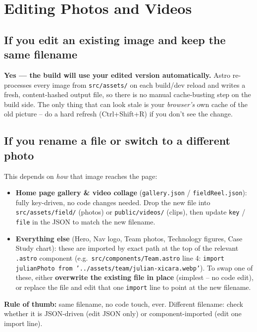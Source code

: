 \documentclass[11pt]{article}
\newcommand{\code}[1]{\texttt{\small #1}}
\newcommand{\file}[1]{\texttt{\small\color{ixaccent}#1}}
\begin{document}
\section{Editing Photos and Videos}

\subsection{If you edit an existing image and keep the same filename}
\textbf{Yes --- the build will use your edited version automatically.} Astro
re-processes every image from \file{src/assets/} on each build/dev reload
and writes a fresh, content-hashed output file, so there is no manual
cache-busting step on the build side. The only thing that can look stale is
your \emph{browser's} own cache of the old picture -- do a hard refresh
(Ctrl+Shift+R) if you don't see the change.

\subsection{If you rename a file or switch to a different photo}
This depends on \emph{how} that image reaches the page:

\begin{itemize}[leftmargin=1.4em]
  \item \textbf{Home page gallery \& video collage} (\file{gallery.json} /
    \file{fieldReel.json}): fully key-driven, no code changes needed. Drop
    the new file into \file{src/assets/field/} (photos) or
    \file{public/videos/} (clips), then update \code{key} / \code{file} in
    the JSON to match the new filename.
  \item \textbf{Everything else} (Hero, Nav logo, Team photos, Technology
    figures, Case Study chart): these are imported by exact path at the top
    of the relevant \file{.astro} component (e.g.\
    \file{src/components/Team.astro} line 4:
    \code{import julianPhoto from '../assets/team/julian-xicara.webp'}). To
    swap one of these, either \textbf{overwrite the existing file in place}
    (simplest -- no code edit), or replace the file and edit that one
    \code{import} line to point at the new filename.
\end{itemize}

\begin{notebox}
\textbf{Rule of thumb:} same filename, no code touch, ever. Different
filename: check whether it is JSON-driven (edit JSON only) or
component-imported (edit one import line).
\end{notebox}
\end{document}
